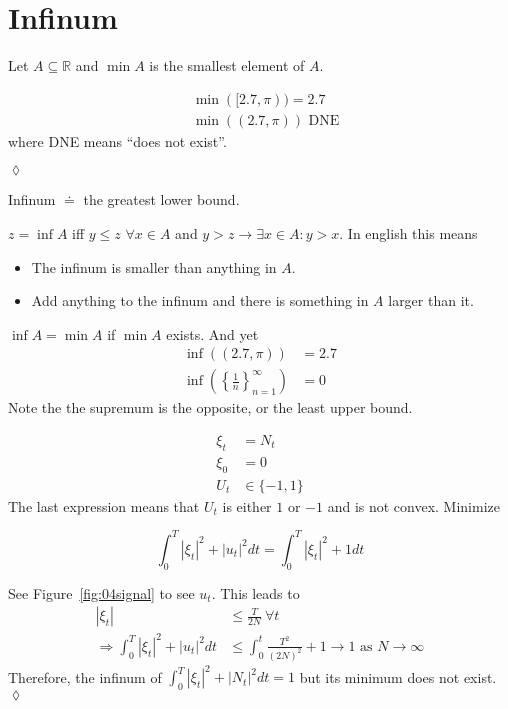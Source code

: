 \section{Infinum}
Let $A\subseteq\mathbb{R}$ and $\min A$ is the smallest element of $A$.

\begin{example}
\begin{align*}
&\min([2.7,\pi)) = 2.7 \\%
&\min((2.7,\pi)) \text{~DNE}
\end{align*}
where DNE means ``does not exist''.
\end{example}
$\lozenge$

\begin{definition}
Infinum $\doteq$ the greatest lower bound.
\end{definition}

$z = \inf A$ iff $y\leq z$ $\forall x\in A$ and $y>z\to\exists x\in A: y>x$.
In english this means
\begin{itemize}
\item The infinum is smaller than anything in $A$.
\item Add anything to the infinum and there is something in $A$ larger than it.
\end{itemize}
$\inf A = \min A$ if $\min A$ exists.
And yet
\begin{align*}
\inf((2.7,\pi)) &= 2.7 \\
\inf\left(\left\lbrace\frac{1}{n}\right\rbrace_{n=1}^\infty\right) &= 0
\end{align*}
Note the the supremum is the opposite, or the least upper bound.

\begin{example}
\begin{align*}
\xi_t &= N_t \\
\xi_0 &= 0 \\
U_t&\in\{-1,1\}
\end{align*}
The last expression means that $U_t$ is either $1$ or $-1$ and is not convex.
Minimize

\begin{equation*}
\int_0^T|\xi_t|^2 + |u_t|^2dt = \int_0^T|\xi_t|^2 + 1dt
\end{equation*}

See Figure~\ref{fig:04signal} to see $u_t$.
This leads to
\begin{align*}
|\xi_t| &\leq \frac{T}{2N}~\forall t \\
\Rightarrow \int_0^T|\xi_t|^2+|u_t|^2dt &\leq \int_0^t\frac{T^2}{{(2N)}^2} + 1 \to 1 \text{~as~} N\to\infty
\end{align*}
Therefore, the infinum of $\int_0^T|\xi_t|^2+|N_t|^2dt = 1$ but its minimum does not exist.
$\lozenge$
\end{example}

